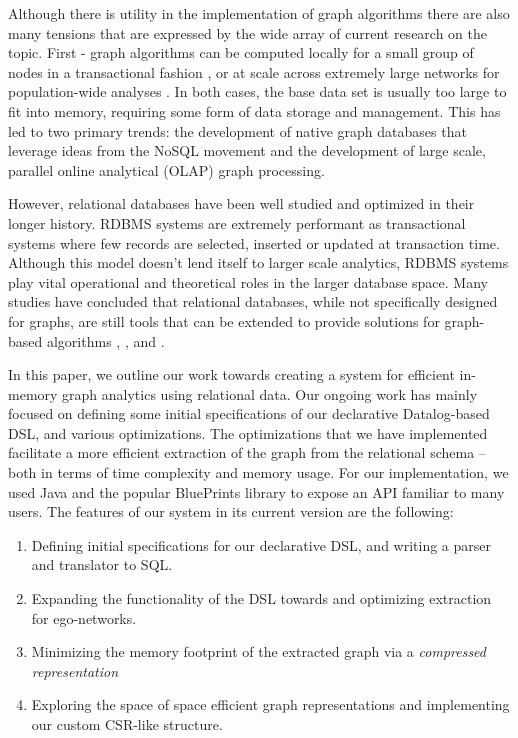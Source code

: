 \documentclass[11pt,letterpaper]{article}
\begin{document}
Although there is utility in the implementation of graph algorithms there are also many tensions that are expressed by the wide array of current research on the topic. First - graph algorithms can be computed locally for a small group of nodes in a transactional fashion \cite{jadhav_comparative_2014}, or at scale across extremely large networks for population-wide analyses \cite{cuzzocrea_big_2014}. In both cases, the base data set is usually too large to fit into memory, requiring some form of data storage and management. This has led to two primary trends: the development of native graph databases that leverage ideas from the NoSQL movement and the development of large scale, parallel online analytical (OLAP) graph processing.

However, relational databases have been well studied and optimized in their longer history. RDBMS systems are extremely performant as transactional systems where few records are selected, inserted or updated at transaction time. Although this model doesn't lend itself to larger scale analytics, RDBMS systems play vital operational and theoretical roles in the larger database space. Many studies have concluded that relational databases, while not specifically designed for graphs, are still tools that can be extended to provide solutions for graph-based algorithms \cite{welc_graph_2013}, \cite{najork_hammers_2012}, and \cite{vicknair_comparison_2010}.


In this paper, we outline our work towards creating a system for efficient in-memory graph analytics using relational data. Our ongoing work has mainly focused on defining some initial specifications of our declarative Datalog-based DSL, and various optimizations. The optimizations that we have implemented facilitate a more efficient extraction of the graph from the relational schema -- both in terms of time complexity and memory usage. For our implementation, we used Java and the popular BluePrints library to expose an API familiar to many users. The features of our system in its current version are the following:\\

\begin{enumerate}

	\item Defining initial specifications for our declarative DSL, and writing a parser and translator to SQL.
	\item Expanding the functionality of the DSL towards and optimizing extraction for ego-networks.
	\item Minimizing the memory footprint of the extracted graph via a \textit{compressed representation}
	\item Exploring the space of space efficient graph representations and implementing our custom CSR-like structure. %

\end{enumerate}
\end{document}
